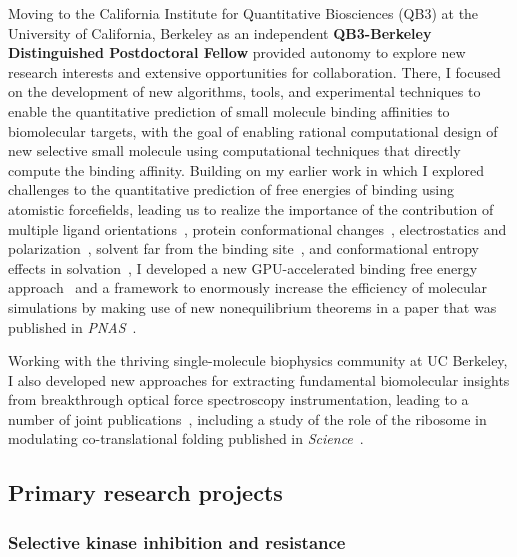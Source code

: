 \documentclass[10pt]{article}
\begin{document}
Moving to the California Institute for Quantitative Biosciences (QB3) at the University of California, Berkeley as an independent {\bf QB3-Berkeley Distinguished Postdoctoral Fellow} provided autonomy to explore new research interests and extensive opportunities for collaboration.
There, I focused on the development of new algorithms, tools, and experimental techniques to enable the quantitative prediction of small molecule binding affinities to biomolecular targets, with the goal of enabling rational computational design of new selective small molecule using computational techniques that directly compute the binding affinity.
Building on my earlier work in which I explored challenges to the quantitative prediction of free energies of binding using atomistic forcefields, leading us to realize the importance of the contribution of multiple ligand orientations~\cite{mobley-chodera-dill:2006:jcp:orientation-restraints}, protein conformational changes~\cite{mobley-chodera-dill:2007:jctc:confine-and-release}, electrostatics and polarization~\cite{mobley:jpcb:2007:comparison-of-charge-models}, solvent far from the binding site~\cite{shirts-mobley-chodera-pande:2007:jpcb:dispersion-corrections}, and conformational entropy effects in solvation~\cite{mobley:jpcb:2008:implicit-hydration}, I developed a new GPU-accelerated binding free energy approach~\cite{wang:jcamd:2013:yank} and a framework to enormously increase the efficiency of molecular simulations by making use of new nonequilibrium theorems in a paper that was published in \emph{PNAS}~\cite{ncmc}.

Working with the thriving single-molecule biophysics community at UC Berkeley, I also developed new approaches for extracting fundamental biomolecular insights from breakthrough optical force spectroscopy instrumentation, leading to a number of joint publications~\cite{elms:biophys-j:2012:constant-force-feedback,elms:pnas:2012:molten-globule,chodera:2011:rate-theory,bhmm}, including a study of the role of the ribosome in modulating co-translational folding published in \emph{Science}~\cite{kaiser:2011:ribosome-folding}.

\eject

\subsection*{Primary research projects}

\vspace{-0.3cm}
\subsubsection*{Selective kinase inhibition and resistance}
\vspace{-0.3cm}
\end{document}
